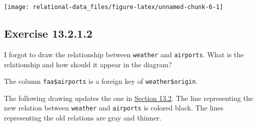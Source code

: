 \documentclass[]{book}
\newenvironment{Shaded}{\begin{snugshade}}{\end{snugshade}}
\newcommand{\CommentTok}[1]{\textcolor[rgb]{0.56,0.35,0.01}{\textit{#1}}}
\newcommand{\DataTypeTok}[1]{\textcolor[rgb]{0.13,0.29,0.53}{#1}}
\newcommand{\DecValTok}[1]{\textcolor[rgb]{0.00,0.00,0.81}{#1}}
\newcommand{\FloatTok}[1]{\textcolor[rgb]{0.00,0.00,0.81}{#1}}
\newcommand{\KeywordTok}[1]{\textcolor[rgb]{0.13,0.29,0.53}{\textbf{#1}}}
\newcommand{\NormalTok}[1]{#1}
\newcommand{\OperatorTok}[1]{\textcolor[rgb]{0.81,0.36,0.00}{\textbf{#1}}}
\newcommand{\StringTok}[1]{\textcolor[rgb]{0.31,0.60,0.02}{#1}}
\theoremstyle{plain}
\theoremstyle{remark}
\begin{document}
\begin{Shaded}
\end{Shaded}

\begin{center}\texttt{[image: relational-data\_files/figure-latex/unnamed-chunk-6-1]} \end{center}

\hypertarget{exercise-13.2.1.2}{%
\subsection*{\texorpdfstring{Exercise {13.2.1.2}}{Exercise 13.2.1.2}}\label{exercise-13.2.1.2}}

I forgot to draw the relationship between \texttt{weather} and \texttt{airports}.
What is the relationship and how should it appear in the diagram?

The column \texttt{faa\$airports} is a foreign key of \texttt{weather\$origin}.

The following drawing updates the one in \href{https://r4ds.had.co.nz/relational-data.html\#nycflights13-relational}{Section 13.2}.
The line representing the new relation between \texttt{weather} and \texttt{airports} is colored black.
The lines representing the old relations are gray and thinner.
\end{document}
